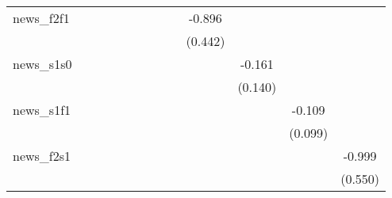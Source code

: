 {\begin{tabular}{l*{12}{c}}
\addlinespace
news\_f2f1   &                     &                     &                     &                     &                     &                     &                     &                     &      -0.896\sym{*}  &                     &                     &                     \\
            &                     &                     &                     &                     &                     &                     &                     &                     &     (0.442)         &                     &                     &                     \\
\addlinespace
news\_s1s0   &                     &                     &                     &                     &                     &                     &                     &                     &                     &      -0.161         &                     &                     \\
            &                     &                     &                     &                     &                     &                     &                     &                     &                     &     (0.140)         &                     &                     \\
\addlinespace
news\_s1f1   &                     &                     &                     &                     &                     &                     &                     &                     &                     &                     &      -0.109         &                     \\
            &                     &                     &                     &                     &                     &                     &                     &                     &                     &                     &     (0.099)         &                     \\
\addlinespace
news\_f2s1   &                     &                     &                     &                     &                     &                     &                     &                     &                     &                     &                     &      -0.999\sym{*}  \\
            &                     &                     &                     &                     &                     &                     &                     &                     &                     &                     &                     &     (0.550)         \\

\end{tabular}}
